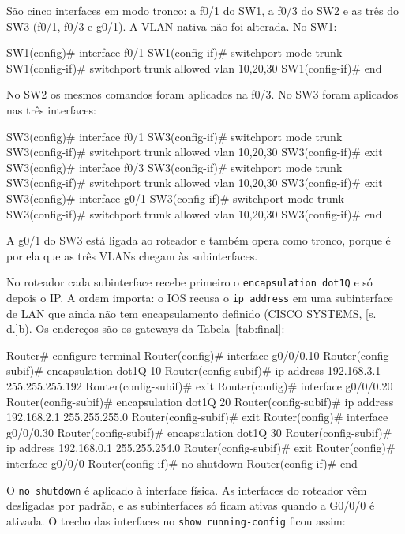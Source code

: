 São cinco interfaces em modo tronco: a f0/1 do SW1, a f0/3 do SW2 e as três do SW3 (f0/1, f0/3 e g0/1). A VLAN nativa não foi alterada. No SW1:

\begin{cmd}
SW1(config)# interface f0/1
SW1(config-if)# switchport mode trunk
SW1(config-if)# switchport trunk allowed vlan 10,20,30
SW1(config-if)# end
\end{cmd}

No SW2 os mesmos comandos foram aplicados na f0/3. No SW3 foram aplicados nas três interfaces:

\begin{cmd}
SW3(config)# interface f0/1
SW3(config-if)# switchport mode trunk
SW3(config-if)# switchport trunk allowed vlan 10,20,30
SW3(config-if)# exit
SW3(config)# interface f0/3
SW3(config-if)# switchport mode trunk
SW3(config-if)# switchport trunk allowed vlan 10,20,30
SW3(config-if)# exit
SW3(config)# interface g0/1
SW3(config-if)# switchport mode trunk
SW3(config-if)# switchport trunk allowed vlan 10,20,30
SW3(config-if)# end
\end{cmd}

A g0/1 do SW3 está ligada ao roteador e também opera como tronco, porque é por ela que as três VLANs chegam às subinterfaces.


No roteador cada subinterface recebe primeiro o \texttt{encapsulation dot1Q} e só depois o IP. A ordem importa: o IOS recusa o \texttt{ip address} em uma subinterface de LAN que ainda não tem encapsulamento definido (CISCO SYSTEMS, [s. d.]b). Os endereços são os gateways da Tabela~\ref{tab:final}:

\begin{cmd}
Router# configure terminal
Router(config)# interface g0/0/0.10
Router(config-subif)# encapsulation dot1Q 10
Router(config-subif)# ip address 192.168.3.1 255.255.255.192
Router(config-subif)# exit
Router(config)# interface g0/0/0.20
Router(config-subif)# encapsulation dot1Q 20
Router(config-subif)# ip address 192.168.2.1 255.255.255.0
Router(config-subif)# exit
Router(config)# interface g0/0/0.30
Router(config-subif)# encapsulation dot1Q 30
Router(config-subif)# ip address 192.168.0.1 255.255.254.0
Router(config-subif)# exit
Router(config)# interface g0/0/0
Router(config-if)# no shutdown
Router(config-if)# end
\end{cmd}

O \texttt{no shutdown} é aplicado à interface física. As interfaces do roteador vêm desligadas por padrão, e as subinterfaces só ficam ativas quando a G0/0/0 é ativada. O trecho das interfaces no \texttt{show running-config} ficou assim:

